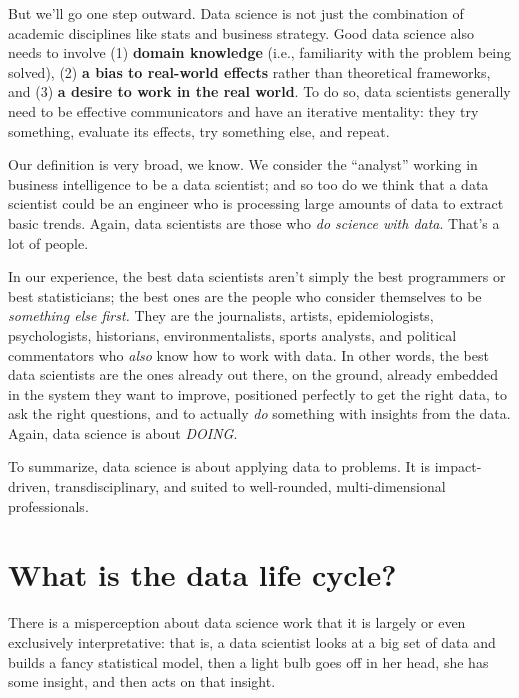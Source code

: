 \documentclass[
]{book}
\begin{document}
But we'll go one step outward. Data science is not just the combination of academic disciplines like stats and business strategy. Good data science also needs to involve (1) \textbf{domain knowledge} (i.e., familiarity with the problem being solved), (2) \textbf{a bias to real-world effects} rather than theoretical frameworks, and (3) \textbf{a desire to work in the real world}. To do so, data scientists generally need to be effective communicators and have an iterative mentality: they try something, evaluate its effects, try something else, and repeat.

Our definition is very broad, we know. We consider the ``analyst'' working in business intelligence to be a data scientist; and so too do we think that a data scientist could be an engineer who is processing large amounts of data to extract basic trends. Again, data scientists are those who \emph{do science with data}. That's a lot of people.

In our experience, the best data scientists aren't simply the best programmers or best statisticians; the best ones are the people who consider themselves to be \emph{something else first.} They are the journalists, artists, epidemiologists, psychologists, historians, environmentalists, sports analysts, and political commentators who \emph{also} know how to work with data. In other words, the best data scientists are the ones already out there, on the ground, already embedded in the system they want to improve, positioned perfectly to get the right data, to ask the right questions, and to actually \emph{do} something with insights from the data. Again, data science is about \emph{DOING}.

To summarize, data science is about applying data to problems. It is impact-driven, transdisciplinary, and suited to well-rounded, multi-dimensional professionals.

\hypertarget{what-is-the-data-life-cycle}{%
\section*{What is the data life cycle?}\label{what-is-the-data-life-cycle}}

There is a misperception about data science work that it is largely or even exclusively interpretative: that is, a data scientist looks at a big set of data and builds a fancy statistical model, then a light bulb goes off in her head, she has some insight, and then acts on that insight.
\end{document}
